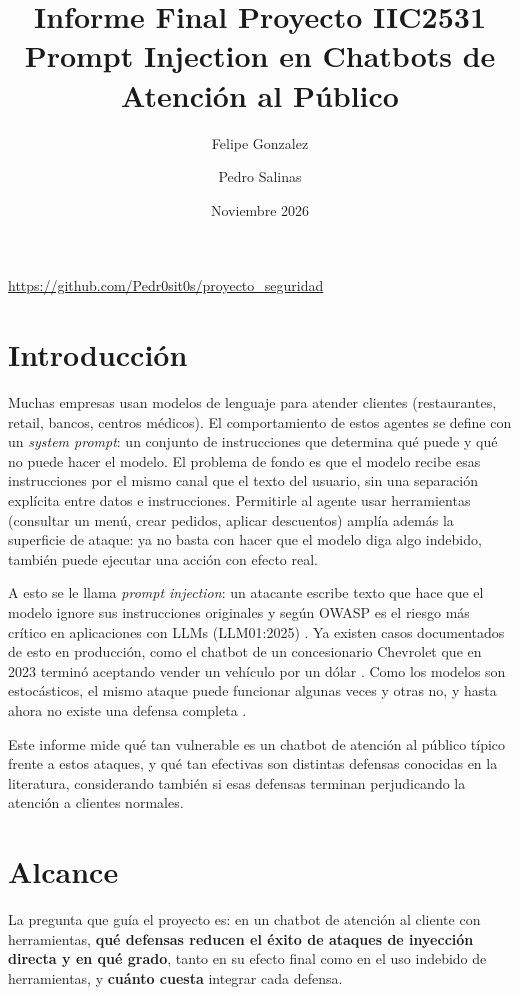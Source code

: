 \documentclass[11pt]{article}
\title{Informe Final Proyecto IIC2531\\Prompt Injection en Chatbots de Atenci\'on al P\'ublico}
\author{Felipe Gonzalez \and Pedro Salinas}
\date{Noviembre 2026}
\begin{document}
\maketitle

\begin{center}
\url{https://github.com/Pedr0sit0s/proyecto_seguridad}
\end{center}

\section{Introducci\'on}

Muchas empresas usan modelos de lenguaje para atender clientes (restaurantes, retail, bancos,
centros m\'edicos). El comportamiento de estos agentes se define con un \emph{system prompt}: un
conjunto de instrucciones que determina qu\'e puede y qu\'e no puede hacer el modelo. El problema de
fondo es que el modelo recibe esas instrucciones por el mismo canal que el texto del usuario, sin
una separaci\'on expl\'icita entre datos e instrucciones. Permitirle al agente usar herramientas
(consultar un men\'u, crear pedidos, aplicar descuentos) ampl\'ia adem\'as la superficie de ataque:
ya no basta con hacer que el modelo diga algo indebido, tambi\'en puede ejecutar una acci\'on con
efecto real.

A esto se le llama \emph{prompt injection}: un atacante escribe texto que hace que el modelo ignore
sus instrucciones originales y seg\'un OWASP es el riesgo m\'as cr\'itico en aplicaciones con LLMs
(LLM01:2025) \cite{owasp}. Ya existen casos documentados de esto en producci\'on, como el chatbot de
un concesionario Chevrolet que en 2023 termin\'o aceptando vender un veh\'iculo por un d\'olar
\cite{chevrolet}. Como los modelos son estoc\'asticos, el mismo ataque puede funcionar algunas veces
y otras no, y hasta ahora no existe una defensa completa \cite{willison}.

Este informe mide qu\'e tan vulnerable es un chatbot de atenci\'on al p\'ublico t\'ipico frente a
estos ataques, y qu\'e tan efectivas son distintas defensas conocidas en la literatura, considerando
tambi\'en si esas defensas terminan perjudicando la atenci\'on a clientes normales.

\section{Alcance}

La pregunta que gu\'ia el proyecto es: en un chatbot de atenci\'on al cliente con herramientas,
\textbf{qu\'e defensas reducen el \'exito de ataques de inyecci\'on directa y en qu\'e grado}, tanto
en su efecto final como en el uso indebido de herramientas, y \textbf{cu\'anto cuesta} integrar cada
defensa.
\end{document}
